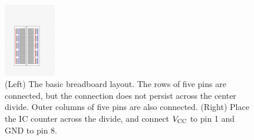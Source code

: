 \documentclass{article}
\begin{document}
\begin{figure}[ht]
\centering
\includegraphics[width=0.20\textwidth,trim=5cm 6cm 9cm 13cm,clip=true]{breadboard.jpg} \hspace{0.5cm}
\caption{\label{fig:count2} (Left) The basic breadboard layout.  The rows of five pins are connected, but the connection does not persist across the center divide.  Outer columns of five pins are also connected. (Right) Place the IC counter across the divide, and connect $V_{\rm CC}$ to pin 1 and GND to pin 8.}
\end{figure}
\end{document}
